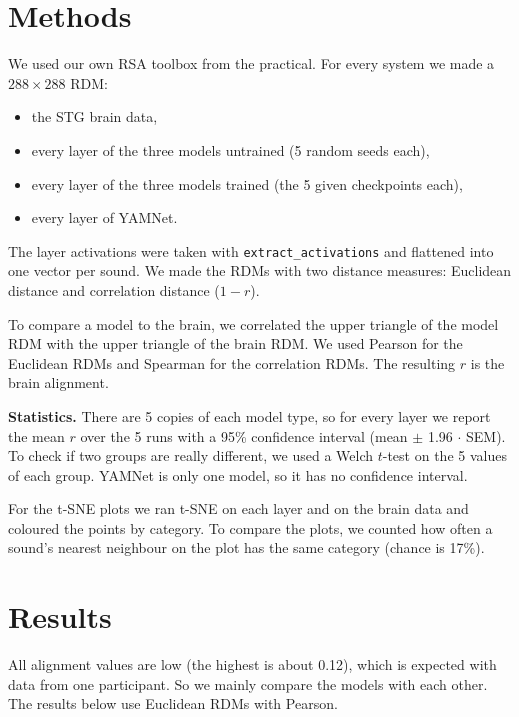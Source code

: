 \documentclass[11pt,a4paper]{article}
\begin{document}
\section{Methods}

We used our own RSA toolbox from the practical. For every system we made a $288 \times 288$ RDM:
\begin{itemize}
  \item the STG brain data,
  \item every layer of the three models untrained (5 random seeds each),
  \item every layer of the three models trained (the 5 given checkpoints each),
  \item every layer of YAMNet.
\end{itemize}
The layer activations were taken with \texttt{extract\_activations} and flattened into one vector per sound.
We made the RDMs with two distance measures: Euclidean distance and correlation distance ($1 - r$).

To compare a model to the brain, we correlated the upper triangle of the model RDM with the upper triangle of
the brain RDM. We used Pearson for the Euclidean RDMs and Spearman for the correlation RDMs. The resulting
$r$ is the brain alignment.

\textbf{Statistics.} There are 5 copies of each model type, so for every layer we report the mean $r$ over
the 5 runs with a 95\% confidence interval (mean $\pm$ 1.96 $\cdot$ SEM). To check if two groups are really
different, we used a Welch $t$-test on the 5 values of each group. YAMNet is only one model, so it has no
confidence interval.

For the t-SNE plots we ran t-SNE on each layer and on the brain data and coloured the points by category. To
compare the plots, we counted how often a sound's nearest neighbour on the plot has the same category
(chance is 17\%).

\section{Results}

All alignment values are low (the highest is about 0.12), which is expected with data from one participant.
So we mainly compare the models with each other. The results below use Euclidean RDMs with Pearson.
\end{document}
